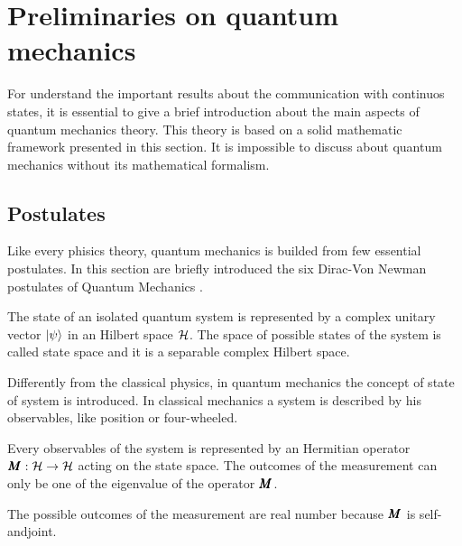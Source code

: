 \section{Preliminaries on quantum mechanics}
    For understand the important results about the communication with continuos
    states, it is essential to give a brief introduction about the main aspects 
    of quantum mechanics theory.
    This theory is based on a solid mathematic framework presented in this section.
    It is impossible to discuss about quantum mechanics without its mathematical 
    formalism.
    
    \subsection{Postulates}
    Like every phisics theory, quantum mechanics is builded from few 
    essential postulates.
    In this section are briefly introduced the six Dirac-Von Newman 
    postulates of Quantum Mechanics \cite{quantumMec_Dirac,quantumMec_Neumann}.

    \begin{postulate}
        The state of an isolated quantum system is represented by a complex unitary 
        vector $\ket{\psi}$ in an Hilbert space $\mathcal{H}$.
        The space of possible states of the system is called state space and it is a
        separable complex Hilbert space.
        \label{post:1}
    \end{postulate}
    \begin{observation*}
        Differently from the classical physics, in quantum mechanics the concept
        of state of system is introduced. In classical mechanics a system is 
        described by his observables, like position or four-wheeled.
    \end{observation*}
    
    \begin{postulate}[Observables]
        Every observables of the system is represented by an Hermitian operator 
        $\Operator{M}:\Hilbert\to\Hilbert$ acting on the state space.
        The outcomes of the measurement can only be one of the eigenvalue of the 
        operator $\Operator{M}$.
        \label{post:2}
    \end{postulate}
    \begin{observation*}
        The possible outcomes of the measurement are real number because $\Operator{M}$
        is self-andjoint. 
    \end{observation*}

